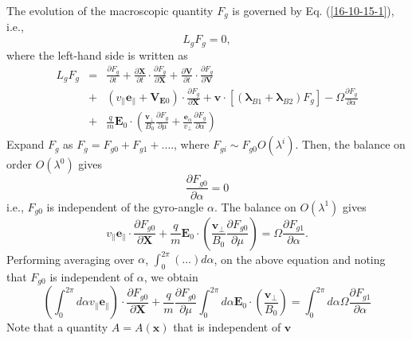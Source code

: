 \documentclass{article}
\newcommand{\tmmathbf}[1]{\ensuremath{\boldsymbol{#1}}}
\begin{document}
The evolution of the macroscopic quantity $F_g$ is governed by Eq.
(\ref{16-10-15-1}), i.e.,
\begin{equation}
  L_g F_g = 0,
\end{equation}
where the left-hand side is written as
\begin{eqnarray*}
  L_g F_g & = & \frac{\partial F_g}{\partial t} + \frac{\partial
  \mathbf{X}}{\partial t} \cdot \frac{\partial F_g}{\partial \mathbf{X}} +
  \frac{\partial \mathbf{V}}{\partial t} \cdot \frac{\partial F_g}{\partial
  \mathbf{V}}\\
  & + & (v_{\parallel} \mathbf{e}_{\parallel} +\mathbf{V}_{\mathbf{E}0})
  \cdot \frac{\partial F_g}{\partial \mathbf{X}} +\mathbf{v} \cdot
  [(\tmmathbf{\lambda}_{B 1} +\tmmathbf{\lambda}_{B 2}) F_g] - \Omega
  \frac{\partial F_g}{\partial \alpha}\\
  & + & \frac{q}{m} \mathbf{E}_0 \cdot \left( \frac{\mathbf{v}_{\perp}}{B_0} 
  \frac{\partial F_g}{\partial \mu} + \frac{\tmmathbf{e}_{\alpha}}{v_{\perp}} 
  \frac{\partial F_g}{\partial \alpha} \right)
\end{eqnarray*}
Expand $F_g$ as $F_g = F_{g 0} + F_{g 1} + \ldots$., where $F_{g i} \sim F_{g
0} O (\lambda^i)$. Then, the balance on order $O (\lambda^0)$ gives
\begin{equation}
  \frac{\partial F_{g 0}}{\partial \alpha} = 0
\end{equation}
i.e., $F_{g 0}$ is independent of the gyro-angle $\alpha$. The balance on $O
(\lambda^1)$ gives
\begin{equation}
  v_{\parallel} \mathbf{e}_{\parallel} \cdot \frac{\partial F_{g 0}}{\partial
  \mathbf{X}} + \frac{q}{m} \mathbf{E}_0 \cdot \left(
  \frac{\mathbf{v}_{\perp}}{B_0}  \frac{\partial F_{g 0}}{\partial \mu}
  \right) = \Omega \frac{\partial F_{g 1}}{\partial \alpha} .
\end{equation}
Performing averaging over $\alpha$, $\int_0^{2 \pi} (\ldots) d \alpha$, on the
above equation and noting that $F_{g 0}$ is independent of $\alpha$, we obtain
\begin{equation}
  \label{17-5-15-4} \left( \int_0^{2 \pi} d \alpha v_{\parallel}
  \mathbf{e}_{\parallel} \right) \cdot \frac{\partial F_{g 0}}{\partial
  \mathbf{X}} + \frac{q}{m} \frac{\partial F_{g 0}}{\partial \mu} \int_0^{2
  \pi} d \alpha \mathbf{E}_0 \cdot \left( \frac{\mathbf{v}_{\perp}}{B_0} 
  \right) = \int_0^{2 \pi} d \alpha \Omega \frac{\partial F_{g 1}}{\partial
  \alpha}
\end{equation}
Note that a quantity $A = A (\mathbf{x})$ that is independent of $\mathbf{v}$
\end{document}
